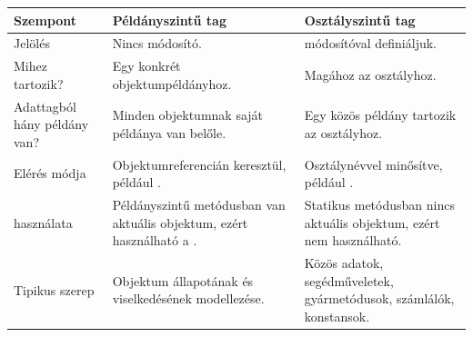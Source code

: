 \begin{tabularx}{\textwidth}{L{29mm}X X}
\toprule
\textbf{Szempont} & \textbf{Példányszintű tag} & \textbf{Osztályszintű tag} \\
\midrule
Jelölés & Nincs  módosító. &  módosítóval definiáljuk. \\
Mihez tartozik? & Egy konkrét objektumpéldányhoz. & Magához az osztályhoz. \\
Adattagból hány példány van? & Minden objektumnak saját példánya van belőle. & Egy közös példány tartozik az osztályhoz. \\
Elérés módja & Objektumreferencián keresztül, például . & Osztálynévvel minősítve, például . \\
 használata & Példányszintű metódusban van aktuális objektum, ezért használható a . & Statikus metódusban nincs aktuális objektum, ezért  nem használható. \\
Tipikus szerep & Objektum állapotának és viselkedésének modellezése. & Közös adatok, segédműveletek, gyármetódusok, számlálók, konstansok. \\
\bottomrule
\end{tabularx}
